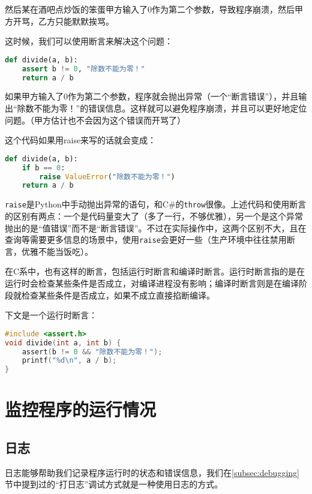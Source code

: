 然后某在酒吧点炒饭的笨蛋甲方输入了0作为第二个参数，导致程序崩溃，然后甲方开骂，乙方只能默默挨骂。

这时候，我们可以使用断言来解决这个问题：
\begin{lstlisting}[language=Python]
def divide(a, b):
    assert b != 0, "除数不能为零！"
    return a / b
\end{lstlisting}

如果甲方输入了0作为第二个参数，程序就会抛出异常（一个“断言错误”），并且输出“除数不能为零！”的错误信息。这样就可以避免程序崩溃，并且可以更好地定位问题。（甲方估计也不会因为这个错误而开骂了）

这个代码如果用raise来写的话就会变成：
\begin{lstlisting}[language=Python]
def divide(a, b):
    if b == 0:
        raise ValueError("除数不能为零！")
    return a / b
\end{lstlisting}
\texttt{raise}是Python中手动抛出异常的语句，和C\#的\texttt{throw}很像。上述代码和使用断言的区别有两点：一个是代码量变大了（多了一行，不够优雅），另一个是这个异常抛出的是“值错误”而不是“断言错误”。不过在实际操作中，这两个区别不大，且在查询等需要更多信息的场景中，使用\texttt{raise}会更好一些（生产环境中往往禁用断言，优雅不能当饭吃）。

在C系中，也有这样的断言，包括运行时断言和编译时断言。运行时断言指的是在运行时会检查某些条件是否成立，对编译进程没有影响；编译时断言则是在编译阶段就检查某些条件是否成立，如果不成立直接掐断编译。

下文是一个运行时断言：
\begin{lstlisting}[language=C]
#include <assert.h>
void divide(int a, int b) {
    assert(b != 0 && "除数不能为零！");
    printf("%d\n", a / b);
}
\end{lstlisting}

\section{监控程序的运行情况}\label{sec:monitoring}

\subsection{日志}\label{subsec:logging}

日志能够帮助我们记录程序运行时的状态和错误信息，我们在\ref{subsec:debugging}节中提到过的“打日志”调试方式就是一种使用日志的方式。

